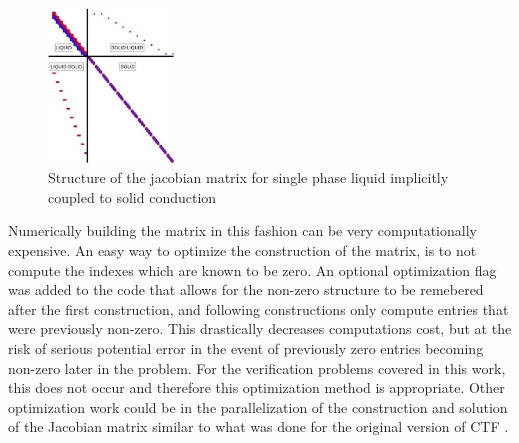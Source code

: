     \begin{figure}[!h]
    	\centering
    	\includegraphics[width=0.30\textwidth]{images/Implicit-Diagram.jpg}
    	\caption{Structure of the jacobian matrix for single phase liquid
    	implicitly coupled to solid conduction}
    	\label{fig:Implicit-Diagram}
    \end{figure}
    
    Numerically building the matrix in this fashion can be very computationally
    expensive. An easy way to optimize the construction of the matrix, is to not
    compute the indexes which are known to be zero. An optional optimization
    flag was added to the code that allows for the non-zero structure to be
    remebered after the first construction, and following constructions only
    compute entries that were previously non-zero. This drastically decreases
    computations cost, but at the risk of serious potential error in the event
    of previously zero entries becoming non-zero later in the problem. For the
    verification problems covered in this work, this does not occur and
    therefore this optimization method is appropriate. Other optimization work
    could be in the parallelization of the construction and solution of the
    Jacobian matrix similar to what was done for the original version of CTF
    \cite{Salko2014}.
   
    
    
    
    






